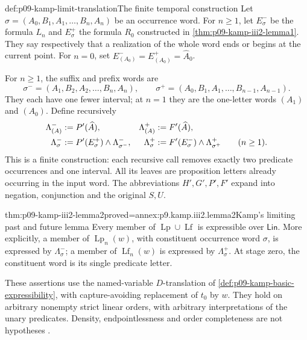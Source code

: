 \begin{hbdefinition}{def:p09-kamp-limit-translation}{The finite temporal construction}
Let
\(\sigma=(A_0,B_1,A_1,\ldots,B_n,A_n)\) be an occurrence word.
For \(n\geq1\), let \(E^-_\sigma\) be the formula \(L_n\) and
\(E^+_\sigma\) the formula \(R_0\) constructed in
\cref{thm:p09-kamp-iii2-lemma1}.  They say respectively that a realization
of the whole word ends or begins at the current point.  For \(n=0\),
set \(E^-_{(A_0)}=E^+_{(A_0)}=\widehat A_0\).

For \(n\geq1\), the suffix and prefix words are
\[
 \sigma^-=(A_1,B_2,A_2,\ldots,B_n,A_n),\qquad
 \sigma^+=(A_0,B_1,A_1,\ldots,B_{n-1},A_{n-1}).
\]
They each have one fewer interval; at \(n=1\) they are the one-letter
words \((A_1)\) and \((A_0)\).  Define recursively
\[
\begin{aligned}
 \Lambda^-_{(A)}&\mathrel{:=} P'(\widehat A),&
 \Lambda^+_{(A)}&\mathrel{:=} F'(\widehat A),\\
 \Lambda^-_\sigma&\mathrel{:=}
            P'(E^+_\sigma)\land\Lambda^-_{\sigma^-},&
 \Lambda^+_\sigma&\mathrel{:=}
            F'(E^-_\sigma)\land\Lambda^+_{\sigma^+}
                    \qquad(n\geq1).
\end{aligned}
\]
This is a finite construction: each recursive call removes exactly two
predicate occurrences and one interval.  All its leaves are proposition
letters already occurring in the input word.  The abbreviations \(H',G',P',F'\)
expand into negation, conjunction and the original \(S,U\).
\end{hbdefinition}

\begin{hblemma}{thm:p09-kamp-iii2-lemma2}{proved=annex:p9.kamp.iii2.lemma2}{Kamp's limiting past and future lemma}
Every member of \(\operatorname{Lp}\cup\operatorname{Lf}\) is expressible
over \(\mathsf{Lin}\).  More explicitly, a member of
\(\operatorname{Lp}_n(w)\), with constituent occurrence word \(\sigma\),
is expressed by \(\Lambda^-_\sigma\); a member of
\(\operatorname{Lf}_n(w)\) is expressed by \(\Lambda^+_\sigma\).
At stage zero, the constituent word is its single predicate letter.

These assertions use the named-variable \(D\)-translation of
\cref{def:p09-kamp-basic-expressibility}, with capture-avoiding replacement
of \(t_0\) by \(w\).  They hold on arbitrary nonempty strict linear
orders, with arbitrary interpretations of the unary predicates.  Density,
endpointlessness and order completeness are not hypotheses
\cite[ch.~III, lemma~2, pp.~70--73]{Kamp1968}.
\end{hblemma}

